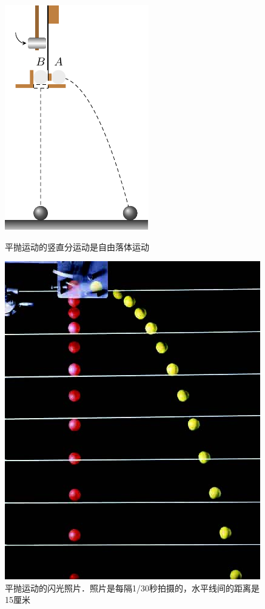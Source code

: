 \begin{figure}[htbp]
    \centering
    \begin{minipage}[b]{0.38\linewidth}
    	\centering
    	\includegraphics{fig/A/4-9.pdf}
    	\caption{平抛运动的竖直分运动是自由落体运动}\label{fig_A_4-9}
    \end{minipage}
    \hfill
    \begin{minipage}[b]{0.57\linewidth}
    	\centering
    	\includegraphics[scale=0.8]{fig/A/4-10.jpg}
    	\caption{平抛运动的闪光照片．照片是每隔1/30秒拍摄的，水平线间的距离是15厘米}\label{fig_A_4-10}
    \end{minipage}
    
\end{figure}

